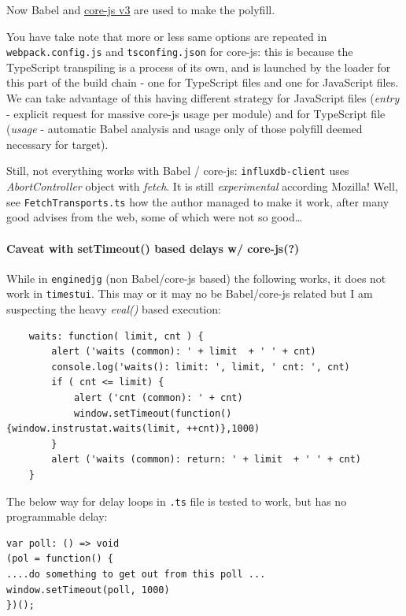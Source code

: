 \documentclass[11pt]{article}
\begin{document}
    Now Babel and
\href{https://github.com/zloirock/core-js/blob/master/docs/2019-03-19-core-js-3-babel-and-a-look-into-the-future.md}{core-js
v3} are used to make the polyfill.

    You have take note that more or less same options are repeated in
\texttt{webpack.config.js} and \texttt{tsconfing.json} for core-js: this
is because the TypeScript transpiling is a process of its own, and is
launched by the loader for this part of the build chain - one for
TypeScript files and one for JavaScript files. We can take advantage of
this having different strategy for JavaScript files (\emph{entry} -
explicit request for massive core-js usage per module) and for
TypeScript file (\emph{usage} - automatic Babel analysis and usage only
of those polyfill deemed necessary for target).

    Still, not everything works with Babel / core-js:
\texttt{influxdb-client} uses \emph{AbortController} object with
\emph{fetch}. It is still \emph{experimental} according Mozilla! Well,
see \texttt{FetchTransports.ts} how the author managed to make it work,
after many good advises from the web, some of which were not so
good\ldots{}

    \hypertarget{caveat-with-settimeout-based-delays-w-core-js}{%
\paragraph{Caveat with setTimeout() based delays w/
core-js(?)}\label{caveat-with-settimeout-based-delays-w-core-js}}

    While in \texttt{enginedjg} (non Babel/core-js based) the following
works, it does not work in \texttt{timestui}. This may or it may no be
Babel/core-js related but I am suspecting the heavy \emph{eval()} based
execution:

    \begin{verbatim}
    waits: function( limit, cnt ) {
        alert ('waits (common): ' + limit  + ' ' + cnt)
        console.log('waits(): limit: ', limit, ' cnt: ', cnt)
        if ( cnt <= limit) {
            alert ('cnt (common): ' + cnt)
            window.setTimeout(function(){window.instrustat.waits(limit, ++cnt)},1000)
        }
        alert ('waits (common): return: ' + limit  + ' ' + cnt)
    }
\end{verbatim}

    The below way for delay loops in \texttt{.ts} file is tested to work,
but has no programmable delay:

    \begin{verbatim}
var poll: () => void
(pol = function() {
....do something to get out from this poll ...
window.setTimeout(poll, 1000)
})();
\end{verbatim}
\end{document}

